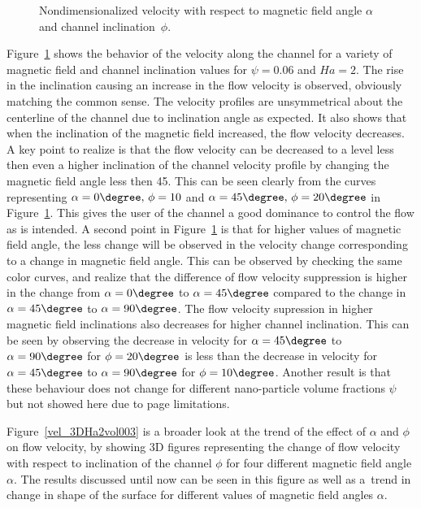 \begin{figure}
\centerline{}
\vspace*{5mm}
\caption{Nondimensionalized velocity with  respect to magnetic field angle $\alpha$ and  channel inclination~$\phi$.}
\label{velDistHa2vol006} 
\end{figure}



Figure~\ref{velDistHa2vol006} shows the behavior of the velocity along the channel for a variety of magnetic field and channel inclination values for $\psi = 0.06$ and $Ha = 2$. The rise in the inclination causing an increase in the flow velocity is observed, obviously matching the common sense. The velocity profiles are unsymmetrical about the centerline of the channel due to inclination angle as expected. It also shows that when the inclination of the magnetic field increased, the flow velocity decreases. A key point to realize is that the flow velocity can be decreased to a level less then even a higher inclination of the channel velocity profile by changing the magnetic field angle less then 45\degree. This can be seen clearly from the curves representing $\alpha = 0\degree,\, \phi = 10$ and $\alpha = 45\degree, \,\phi = 20\degree$ in Figure~\ref{velDistHa2vol006}. This gives the user of the channel a good dominance to control the flow as is intended. A second point in Figure~\ref{velDistHa2vol006} is that for higher values of magnetic field angle, the less change will be observed in the velocity change corresponding to a change in magnetic field angle. This can be observed by checking the same color curves, and realize that the difference of flow velocity suppression is higher in the change from $\alpha = 0\degree$ to $\alpha = 45\degree$ compared to the change in $\alpha = 45\degree$ to $\alpha = 90\degree$. The flow velocity supression in higher magnetic field inclinations also decreases for higher channel inclination. This can be seen by observing the decrease in velocity for $\alpha = 45\degree$ to $\alpha = 90\degree$ for $\phi = 20\degree$ is less than the decrease in velocity for $\alpha = 45\degree$ to $\alpha = 90\degree$ for $\phi = 10\degree$. Another result is that these behaviour does not change for different nano-particle volume fractions $\psi$ but not showed here due to page limitations. 


Figure~\ref{vel_3DHa2vol003} is a broader look at the trend of the effect of $\alpha$ and $\phi$ on flow velocity, by showing 3D figures representing the change of flow velocity with respect to inclination of the channel $\phi$ for four different magnetic field angle $\alpha$. The results discussed until now can be seen in this figure as well as a~trend in change in shape of the surface for different values of magnetic field angles $\alpha$.

